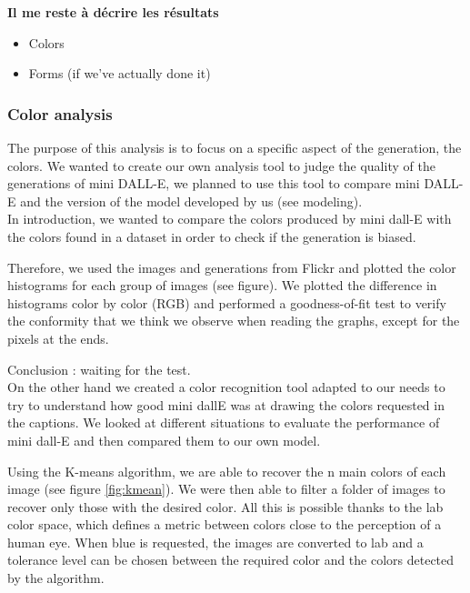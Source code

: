 \documentclass{article}
\begin{document}
\textbf{Il me reste à décrire les résultats}


\begin{itemize}
    \item Colors
    \item Forms (if we've actually done it)
\end{itemize}

\subsubsection{Color analysis}

The purpose of this analysis is to focus on a specific aspect of the generation, the colors. 
We wanted to create our own analysis tool to judge the quality of the generations of mini DALL-E, we planned to use this tool to compare mini DALL-E and the version of the model developed by us (see modeling).\\

In introduction, we wanted to compare the colors produced by mini dall-E with the colors found in a dataset in order to check if the generation is biased. 

Therefore, we used the images and generations from Flickr and plotted the color histograms for each group of images (see figure). We plotted the difference in histograms color by color (RGB) and performed a goodness-of-fit test to verify the conformity that we think we observe when reading the graphs, except for the pixels at the ends.

Conclusion : waiting for the test.\\

On the other hand we created a color recognition tool adapted to our needs to try to understand how good mini dallE was at drawing the colors requested in the captions. We looked at different situations to evaluate the performance of mini dall-E and then compared them to our own model.

Using the K-means algorithm, we are able to recover the n main colors of each image (see figure \ref{fig:kmean}). We were then able to filter a folder of images to recover only those with the desired color. All this is possible thanks to the lab color space, which defines a metric between colors close to the perception of a human eye. When blue is requested, the images are converted to lab and a tolerance level can be chosen between the required color and the colors detected by the algorithm.\\
\end{document}
